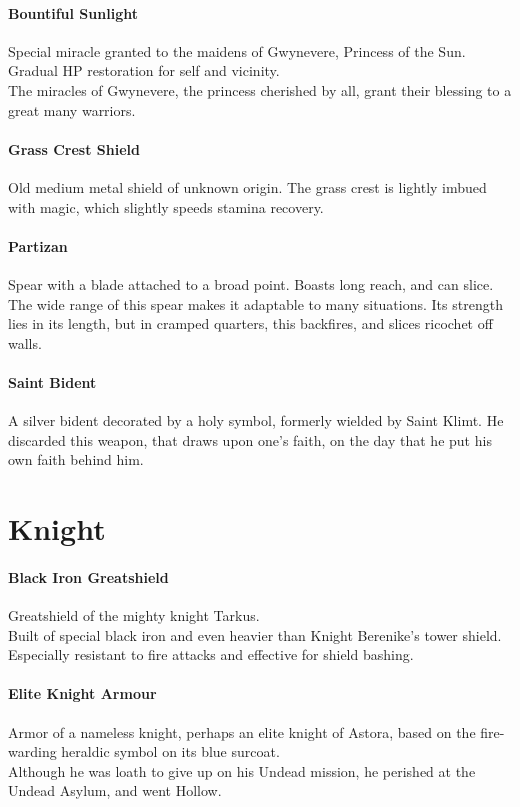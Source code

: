 \documentclass[twocolumn,a4paper]{article}
\begin{document}
\paragraph{Bountiful Sunlight}
Special miracle granted to the maidens of Gwynevere, Princess of the Sun. Gradual HP restoration for self and vicinity.\\
The miracles of Gwynevere, the princess cherished by all, grant their blessing to a great many warriors.
\paragraph{Grass Crest Shield}
Old medium metal shield of unknown origin. The grass crest is lightly imbued with magic, which slightly speeds stamina recovery.
\paragraph{Partizan}
Spear with a blade attached to a broad point. Boasts long reach, and can slice.\\
The wide range of this spear makes it adaptable to many situations. Its strength lies in its length, but in cramped quarters, this backfires, and slices ricochet off walls.
\paragraph{Saint Bident}
A silver bident decorated by a holy symbol, formerly wielded by Saint Klimt. He discarded this weapon, that draws upon one's faith, on the day that he put his own faith behind him.
\section*{Knight}
\paragraph{Black Iron Greatshield}
Greatshield of the mighty knight Tarkus.\\
Built of special black iron and even heavier than Knight Berenike's tower shield. Especially resistant to fire attacks and effective for shield bashing.
\paragraph{Elite Knight Armour}
Armor of a nameless knight, perhaps an elite knight of Astora, based on the fire-warding heraldic symbol on its blue surcoat.\\
Although he was loath to give up on his Undead mission, he perished at the Undead Asylum, and went Hollow.
\end{document}
